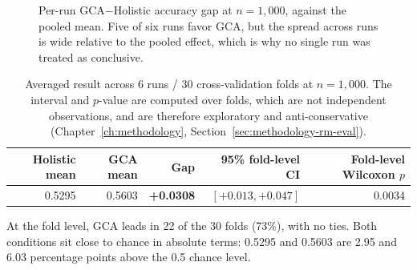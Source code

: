 \begin{figure}[htbp]
\centering
{}
\caption[Per-run GCA$-$Holistic accuracy gap at $n=1{,}000$]{Per-run GCA$-$Holistic accuracy gap at $n=1{,}000$, against the pooled
mean. Five of six runs favor GCA, but the spread across runs is wide relative to
the pooled effect, which is why no single run was treated as conclusive.}
\label{fig:per-run-gaps}
\end{figure}

\begin{table}[htbp]
\centering
\caption[Averaged result across six runs at $n=1{,}000$]{Averaged result across 6 runs / 30 cross-validation folds at
$n=1{,}000$. The interval and $p$-value are computed over folds, which are not
independent observations, and are therefore exploratory and anti-conservative
(Chapter~\ref{ch:methodology}, Section~\ref{sec:methodology-rm-eval}).}
\label{tab:pooled-headline}
\begin{tabular}{rrrrr}
\toprule
Holistic mean & GCA mean & Gap & 95\% fold-level CI & Fold-level Wilcoxon $p$ \\
\midrule
0.5295 & 0.5603 & \textbf{+0.0308} & $[+0.013, +0.047]$ & 0.0034 \\
\bottomrule
\end{tabular}
\end{table}

At the fold level, GCA leads in 22 of the 30 folds (73\%), with no ties. Both
conditions sit close to chance in absolute terms: 0.5295 and 0.5603 are 2.95
and 6.03 percentage points above the 0.5 chance level.

